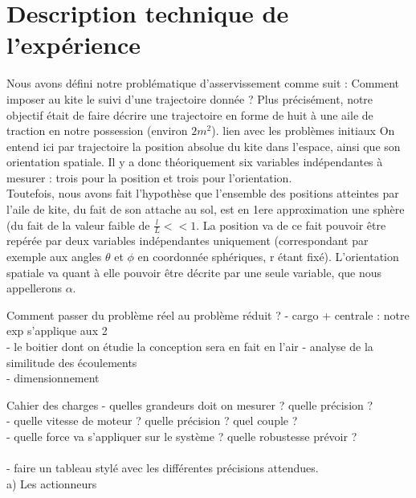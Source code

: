 \documentclass[a4paper,twoside,12pt]{article}
\newcounter{partie}
\newcounter{sous-partie}
\newenvironment{partie}[1]
{
\section{#1}
}
{

}
\newenvironment{sous-partie}[1]
{
\subsection{#1}
}
{

}
\begin{document}
\begin{partie}{Description technique de l'expérience}

Nous avons défini notre problématique d'asservissement comme suit : Comment imposer au kite le suivi d'une trajectoire donnée ?
Plus précisément, notre objectif était de faire décrire une trajectoire en forme de huit à une aile de traction en notre possession (environ $2m^2$). %
{lien avec les problèmes initiaux}
On entend ici par trajectoire la position absolue du kite dans l'espace, ainsi que son orientation spatiale. %
Il y a donc théoriquement six variables indépendantes à mesurer : trois pour la position et trois pour l'orientation.\\
Toutefois, nous avons fait l'hypothèse que l'ensemble des positions atteintes par l'aile de kite, du fait de son attache au sol, est en 1ere approximation une sphère (du fait de la valeur faible de $\frac{l}{L} << 1$. %
La position va de ce fait pouvoir être repérée par deux variables indépendantes uniquement (correspondant par exemple aux angles $\theta$ et $\phi$ en coordonnée sphériques, r étant fixé). %
L'orientation spatiale va quant à elle pouvoir être décrite par une seule variable, que nous appellerons $\alpha$.


\begin{sous-partie}{Comment passer du problème réel au problème réduit ?}
- cargo + centrale : notre exp s'applique aux 2\\
- le boitier dont on étudie la conception sera en fait en l'air - analyse de la similitude des écoulements\\
- dimensionnement
\end{sous-partie}

\begin{sous-partie}{Cahier des charges}
- quelles grandeurs doit on mesurer ? %
quelle précision ? %
\\
- quelle vitesse de moteur ? %
quelle précision ? %
quel couple ? %
\\
- quelle force va s'appliquer sur le système ? %
quelle robustesse prévoir ? %
\\
\\
- faire un tableau stylé avec les différentes précisions attendues.
\\
a)	Les actionneurs\\


\end{sous-partie}
\end{partie}
\end{document}
